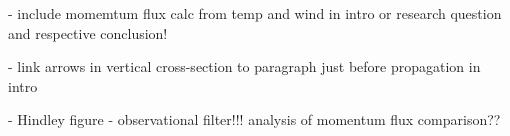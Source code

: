 - include momemtum flux calc from temp and wind in intro or research question and respective conclusion!

- link arrows in vertical cross-section to paragraph just before propagation in intro

- Hindley figure - observational filter!!! analysis of momentum flux comparison??

